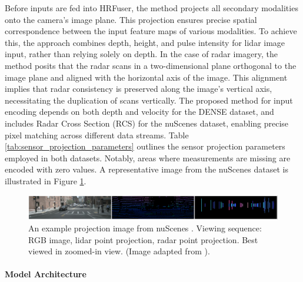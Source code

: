 \documentclass[report.tex]{subfiles}
\begin{document}
    Before inputs are fed into HRFuser, the method projects all secondary modalities onto the camera's image plane. This projection ensures precise spatial correspondence between the input feature maps of various modalities. To achieve this, the approach combines depth, height, and pulse intensity for lidar image input, rather than relying solely on depth. In the case of radar imagery, the method posits that the radar scans in a two-dimensional plane orthogonal to the image plane and aligned with the horizontal axis of the image. This alignment implies that radar consistency is preserved along the image's vertical axis, necessitating the duplication of scans vertically. The proposed method for input encoding depends on both depth and velocity for the DENSE dataset, and includes Radar Cross Section (RCS) for the nuScenes dataset, enabling precise pixel matching across different data streams. Table \ref{tab:sensor_projection_parameters} outlines the sensor projection parameters employed in both datasets. Notably, areas where measurements are missing are encoded with zero values. A representative image from the nuScenes dataset is illustrated in Figure \ref{fig:hrfuser_projection_image}.


    

    \begin{figure}[h]
        \centering
        \includegraphics[width=1.0\textwidth]{images/methods/hrfuser/sample_projection_image.png}
        \caption{An example projection image from nuScenes \cite{caesar2020nuscenes}. Viewing sequence: RGB image, lidar point projection, radar point projection. Best viewed in zoomed-in view. (Image adapted from \cite{broedermann2022hrfuser}).}
        \label{fig:hrfuser_projection_image}
    \end{figure}


    \paragraph*{Model Architecture}

    
\end{document}
